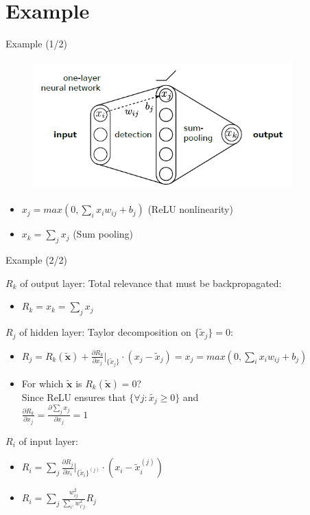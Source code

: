 \documentclass{beamer}
\begin{document}
\section{Example}
\begin{frame}{Example (1/2)}

\begin{figure}[ht]
	\centering
    \includegraphics[width=10cm, height=5cm]{figures/one_layer_network}
	\label{fig:OneLayerNetwork}
\end{figure}

\begin{itemize}
\item $x_j = max(0, \sum_i x_i w_{ij} + b_j)$ (ReLU nonlinearity)
\item $x_k = \sum_j x_j$ (Sum pooling)
\end{itemize}

\end{frame}

\begin{frame}{Example (2/2)}

$R_k$ of output layer: Total relevance that must be backpropagated:
\begin{itemize}
\item $R_k = x_k = \sum_j x_j$ 
\end{itemize}

$R_j$ of hidden layer: Taylor decomposition on $\{ \tilde{x}_j \} = 0$:
\begin{itemize}
\item $R_j = R_k(\tilde{\mathbf{x}}) + \frac{\partial R_k}{\partial x_j} \biggr\rvert_{\{ \tilde{x}_j \}} \cdot (x_j - \tilde{x}_j) = x_j = max(0, \sum_i x_i w_{ij} + b_j)$ \\
\item For which $\tilde{\mathbf{x}}$ is $R_k(\tilde{\mathbf{x}}) = 0$? \\ 
Since ReLU ensures that $\{ \forall j: \tilde{x_j} \geq 0 \}$ and \\ 
$\frac{\partial R_k}{\partial x_j} = \frac{\partial \sum_j x_j}{\partial x_j} = 1$
\end{itemize}

$R_i$ of input layer: 
\begin{itemize}
\item $R_i = \sum_j \frac{\partial R_j}{\partial x_i} \biggr\rvert_{\{ \tilde{x}_i \}^{(j)}} \cdot (x_i - \tilde{x}_i^{(j)})$
\item $R_i = \sum_j \frac{w_{ij}^2}{\sum_{i'} w_{i'j}^2} R_j$ 
\end{itemize}

\end{frame}
\end{document}
